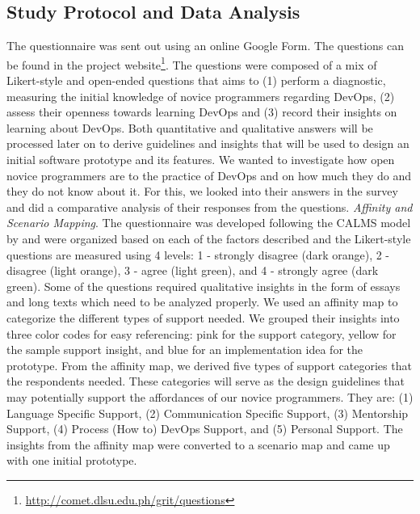 \documentclass{sigchi}
\begin{document}
\subsection{Study Protocol and Data Analysis}
The questionnaire was sent out using an online Google Form. The questions can be found in the project website\footnote{\url{http://comet.dlsu.edu.ph/grit/questions}}. The questions were composed of a mix of Likert-style and open-ended questions that aims to (1) perform a diagnostic, measuring the initial knowledge of novice programmers regarding DevOps, (2) assess their openness towards learning DevOps and (3) record their insights on learning about DevOps. Both quantitative and qualitative answers will be processed later on to derive guidelines and insights that will be used to design an initial software prototype and its features. We wanted to investigate how open novice programmers are to the practice of DevOps and on how much they do and they do not know about it. For this, we looked into their answers in the survey and did a comparative analysis of their responses from the questions. \textit{Affinity and Scenario Mapping}. The questionnaire was developed following the CALMS model by \cite{riley2014keep} and were organized based on each of the factors described and the Likert-style questions are measured using 4 levels: 1 - strongly disagree (dark orange), 2 - disagree (light orange), 3 - agree (light green), and 4 - strongly agree (dark green). Some of the questions required qualitative insights in the form of essays and long texts which need to be analyzed properly. We used an affinity map to categorize the different types of support needed. %
We grouped their insights into three color codes for easy referencing: pink for the support category, yellow for the sample support insight, and blue for an implementation idea for the prototype. From the affinity map, we derived five types of support categories that the respondents needed. These categories will serve as the design guidelines that may potentially support the affordances of our novice programmers. They are: (1) Language Specific Support, (2) Communication Specific Support, (3) Mentorship Support, (4) Process (How to) DevOps Support, and (5) Personal Support. The insights from the affinity map were converted to a scenario map and came up with one initial prototype. 

\end{document}
